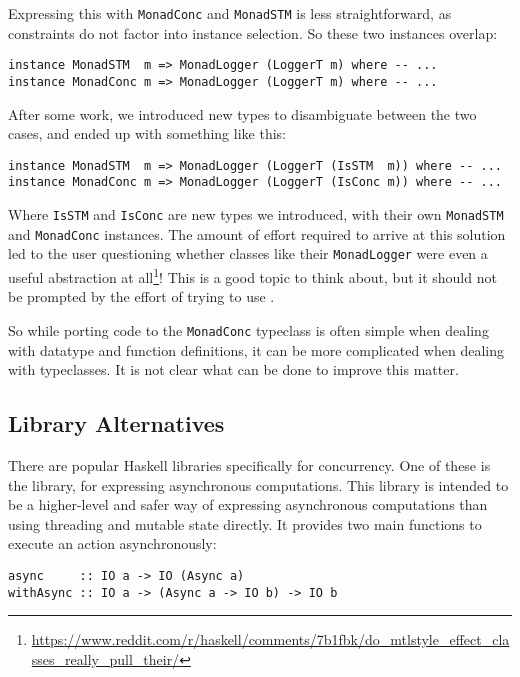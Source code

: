 Expressing this with \verb|MonadConc| and \verb|MonadSTM| is less
straightforward, as constraints do not factor into instance selection.
So these two instances overlap:

\begin{verbatim}
instance MonadSTM  m => MonadLogger (LoggerT m) where -- ...
instance MonadConc m => MonadLogger (LoggerT m) where -- ...
\end{verbatim}

After some work, we introduced new types to disambiguate between the
two cases, and ended up with something like this:

\begin{verbatim}
instance MonadSTM  m => MonadLogger (LoggerT (IsSTM  m)) where -- ...
instance MonadConc m => MonadLogger (LoggerT (IsConc m)) where -- ...
\end{verbatim}

Where \verb|IsSTM| and \verb|IsConc| are new types we introduced, with
their own \verb|MonadSTM| and \verb|MonadConc| instances.  The amount
of effort required to arrive at this solution led to the user
questioning whether classes like their \verb|MonadLogger| were even a
useful abstraction at all\footnote{\url{https://www.reddit.com/r/haskell/comments/7b1fbk/do_mtlstyle_effect_classes_really_pull_their/}}!
This is a good topic to think about, but it should not be prompted by
the effort of trying to use \dejafu{}.

So while porting code to the \verb|MonadConc| typeclass is often
simple when dealing with datatype and function definitions, it can be
more complicated when dealing with typeclasses.  It is not clear what
can be done to improve this matter.

\subsection{Library Alternatives}

There are popular Haskell libraries specifically for concurrency.  One
of these is the  library, for expressing asynchronous
computations.  This library is intended to be a higher-level and safer
way of expressing asynchronous computations than using threading and
mutable state directly.  It provides two main functions to execute an
action asynchronously:

\begin{verbatim}
async     :: IO a -> IO (Async a)
withAsync :: IO a -> (Async a -> IO b) -> IO b
\end{verbatim}

